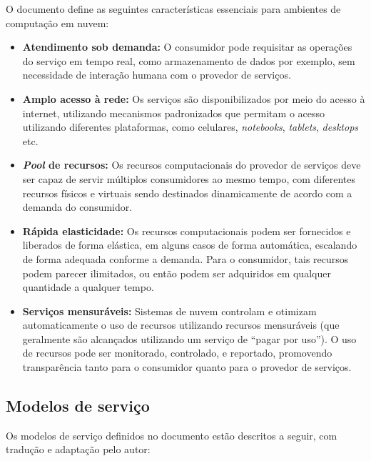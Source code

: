 \documentclass[
	12pt,				%
	openright,			%
	twoside,			%
	a4paper,			%
	english,			%
	french,				%
	spanish,			%
	brazil				%
	]{abntex2}
\begin{document}
O documento define as seguintes características essenciais para ambientes de computação em nuvem:
\begin{itemize}
	\item \textbf{Atendimento sob demanda:} O consumidor pode requisitar as operações do serviço em tempo real, como armazenamento de dados por exemplo, sem necessidade de interação humana com o provedor de serviços.
	\item \textbf{Amplo acesso à rede:} Os serviços são disponibilizados por meio do acesso à internet, utilizando mecanismos padronizados que permitam o acesso utilizando diferentes plataformas, como celulares, \emph{notebooks}, \emph{tablets}, \emph{desktops} etc.
	\item \textbf{\emph{Pool} de recursos:} Os recursos computacionais do provedor de serviços deve ser capaz de servir múltiplos consumidores ao mesmo tempo, com diferentes recursos físicos e virtuais sendo destinados dinamicamente de acordo com a demanda do consumidor.
	\item \textbf{Rápida elasticidade:} Os recursos computacionais podem ser fornecidos e liberados de forma elástica, em alguns casos de forma automática, escalando de forma adequada conforme a demanda. Para o consumidor, tais recursos podem parecer ilimitados, ou então podem ser adquiridos em qualquer quantidade a qualquer tempo.
	\item \textbf{Serviços mensuráveis:} Sistemas de nuvem controlam e otimizam automaticamente o uso de recursos utilizando recursos mensuráveis (que geralmente são alcançados utilizando um serviço de ``pagar por uso''). O uso de recursos pode ser monitorado, controlado, e reportado, promovendo transparência tanto para o consumidor quanto para o provedor de serviços.
\end{itemize}

\subsection{Modelos de serviço}

Os modelos de serviço definidos no documento estão descritos a seguir, com tradução e adaptação pelo autor:
\end{document}
